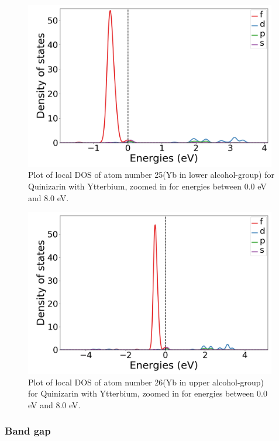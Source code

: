\documentclass{article}
\begin{document}
      \begin{figure}[H]
          \centering
          \includegraphics[width = 11cm]{../fig/Yb_LDOS25_2.png}
          \caption{Plot of local DOS of atom number 25(Yb in lower alcohol-group) for Quinizarin with Ytterbium, zoomed in for energies between 0.0 eV and 8.0 eV. }
          \label{fig:Yb_LDOS25_2}
      \end{figure}

      \begin{figure}[H]
          \centering
          \includegraphics[width = 11cm]{../fig/Yb_LDOS26_2.png}
          \caption{Plot of local DOS of atom number 26(Yb in upper alcohol-group) for Quinizarin with Ytterbium, zoomed in for energies between 0.0 eV and 8.0 eV. }
          \label{fig:Yb_LDOS26_2}
      \end{figure}

      \vspace{1cm}

    \subsubsection{Band gap}
\end{document}
